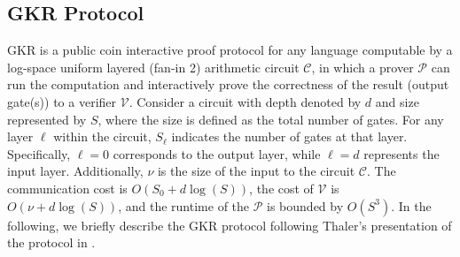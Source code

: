 
%

%
%


\subsection{GKR Protocol}
GKR \cite{GKR2008} is a public coin interactive proof protocol for any language computable by a log-space uniform layered (fan-in 2) arithmetic circuit $\mathcal{C}$, in which a prover $\mathcal{P}$ can run the computation and interactively prove the correctness of the result (output gate(s)) to a verifier $\mathcal{V}$. Consider a circuit with depth denoted by $d$ and size represented by $S$, where the size is defined as the total number of gates. For any layer $\ell$ within the circuit, $S_\ell$ indicates the number of gates at that layer. Specifically, $\ell=0$ corresponds to the output layer, while $\ell=d$ represents the input layer. Additionally, $\nu$ is the size of the input to  the circuit $\mathcal{C}$. The communication cost is $O(S_0 + d\log(S))$, the cost of $\mathcal{V}$  is $O(\nu + d\log(S))$, and the runtime of the $\mathcal{P}$ is bounded by $O(S^3)$. In the following, we briefly describe the GKR protocol following Thaler's presentation of the protocol in \cite{Thaler2022Proofs}.\\



